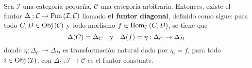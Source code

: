 \documentclass[12pt]{report}
\newcounter{it}
\theoremstyle{largebreak}
\newcommand\cf[3]{\ensuremath{#1:#2\rightarrow#3}}
\newcommand{\Obj}[1]{\ensuremath{\textup{Obj}\left(#1\right)}}
\newcommand{\Hom}[3]{\ensuremath{\textup{Hom}_{#1}\left(#2,#3\right)}}
\newcommand{\Fun}[2]{\ensuremath{\textup{Fun}\left(#1,#2\right)}}
\begin{document}
    \begin{propo}
        Sea $\mathcal{I}$ una categoría pequeña, $\mathcal{C}$ una categoría arbitraria. Entonces, existe el funtor $\cf{\Delta}{\mathcal{C}}{\Fun{\mathcal{I}}{\mathcal{C}}}$ llamado \textbf{el funtor diagonal}, definido como sigue: para todo $C,D\in\Obj{\mathcal{C}}$ y todo morfismo $f\in\Hom{\mathcal{C}}{C}{D}$, se tiene que
        \begin{equation*}
            \Delta(C)=\Delta_C\quad\textup{y}\quad \Delta(f)=\cf{\eta}{\Delta_C}{\Delta_D}
        \end{equation*}
        donde $\cf{\eta}{\Delta_C}{\Delta_D}$ es transformación natural dada por $\eta_i=f$, para todo $i\in\Obj{\mathcal{I}}$, con $\cf{\Delta_C}{\mathcal{I}}{\mathcal{C}}$ es el funtor constante.
    \end{propo}
\end{document}
